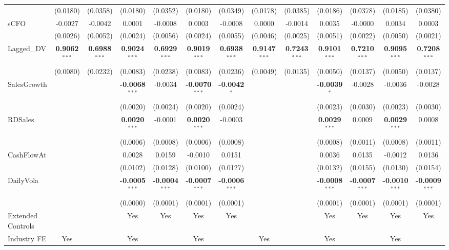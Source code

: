 \documentclass[11pt,a4paper]{article}
\begin{document}
\begin{table}[htbp]
\begin{tabular}{lcccccccccccc}
 & (0.0180) & (0.0358) & (0.0180) & (0.0352) & (0.0180) & (0.0349) & (0.0178) & (0.0385) & (0.0186) & (0.0378) & (0.0185) & (0.0380) \\
sCFO & -0.0027 & -0.0042 & 0.0001 & -0.0008 & 0.0003 & -0.0008 & 0.0000 & -0.0014 & 0.0035 & -0.0000 & 0.0034 & 0.0003 \\
 & (0.0026) & (0.0052) & (0.0024) & (0.0056) & (0.0024) & (0.0055) & (0.0046) & (0.0025) & (0.0051) & (0.0022) & (0.0050) & (0.0021) \\
Lagged\_DV & \textbf{0.9062}$^{***}$ & \textbf{0.6988}$^{***}$ & \textbf{0.9024}$^{***}$ & \textbf{0.6929}$^{***}$ & \textbf{0.9019}$^{***}$ & \textbf{0.6938}$^{***}$ & \textbf{0.9147}$^{***}$ & \textbf{0.7243}$^{***}$ & \textbf{0.9101}$^{***}$ & \textbf{0.7210}$^{***}$ & \textbf{0.9095}$^{***}$ & \textbf{0.7208}$^{***}$ \\
 & (0.0080) & (0.0232) & (0.0083) & (0.0238) & (0.0083) & (0.0236) & (0.0049) & (0.0135) & (0.0050) & (0.0137) & (0.0050) & (0.0137) \\
SalesGrowth &  &  & \textbf{-0.0068}$^{***}$ & -0.0034 & \textbf{-0.0070}$^{***}$ & \textbf{-0.0042}$^{*}$ &  &  & \textbf{-0.0039}$^{*}$ & -0.0028 & -0.0036 & -0.0028 \\
 &  &  & (0.0020) & (0.0024) & (0.0020) & (0.0024) &  &  & (0.0023) & (0.0030) & (0.0023) & (0.0030) \\
RDSales &  &  & \textbf{0.0020}$^{***}$ & -0.0001 & \textbf{0.0020}$^{***}$ & -0.0003 &  &  & \textbf{0.0029}$^{***}$ & 0.0009 & \textbf{0.0029}$^{***}$ & 0.0008 \\
 &  &  & (0.0006) & (0.0008) & (0.0006) & (0.0008) &  &  & (0.0008) & (0.0011) & (0.0008) & (0.0011) \\
CashFlowAt &  &  & 0.0028 & 0.0159 & -0.0010 & 0.0151 &  &  & 0.0036 & 0.0135 & -0.0012 & 0.0136 \\
 &  &  & (0.0102) & (0.0128) & (0.0100) & (0.0127) &  &  & (0.0132) & (0.0155) & (0.0130) & (0.0154) \\
DailyVola &  &  & \textbf{-0.0005}$^{***}$ & \textbf{-0.0004}$^{***}$ & \textbf{-0.0007}$^{***}$ & \textbf{-0.0006}$^{***}$ &  &  & \textbf{-0.0008}$^{***}$ & \textbf{-0.0007}$^{***}$ & \textbf{-0.0010}$^{***}$ & \textbf{-0.0009}$^{***}$ \\
 &  &  & (0.0000) & (0.0001) & (0.0001) & (0.0001) &  &  & (0.0001) & (0.0001) & (0.0001) & (0.0001) \\
\midrule
Extended Controls &  &  & Yes & Yes & Yes & Yes &  &  & Yes & Yes & Yes & Yes \\
Industry FE & Yes &  & Yes &  & Yes &  & Yes &  & Yes &  & Yes &  \\

\end{tabular}
\end{table}
\end{document}
